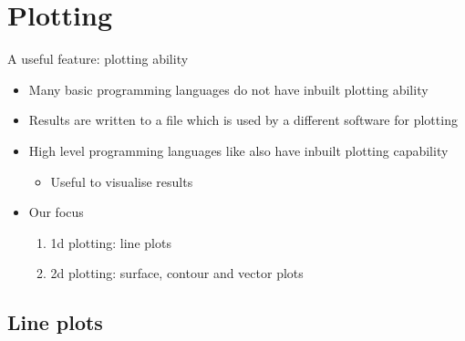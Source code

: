 \section{Plotting}

\begin{frame}{A useful feature: plotting ability}
    \begin{itemize}
        \setitemsep{0.5em}
        \item Many basic programming languages do not have inbuilt plotting ability
        \item<2-> Results are written to a file which is used by a different software for plotting
        \item<3-> High level programming languages like \scilab{} also have inbuilt plotting capability
        \begin{itemize}
            \item Useful to visualise results
        \end{itemize}
        \item<4-> Our focus
        \begin{enumerate}
            \item 1d plotting: line plots
            \item 2d plotting: surface, contour and vector plots
        \end{enumerate}
    \end{itemize}
\end{frame}
\subsection{Line plots}

